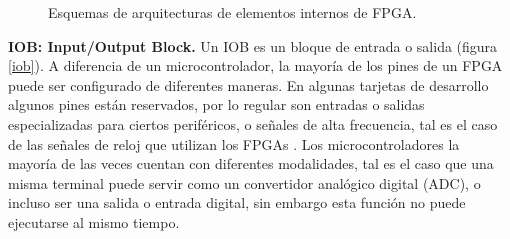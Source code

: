 \documentclass[twoside,spanish,ESP,MSc]{plantillaLabUPV}
\theoremstyle{definition}
\newcommand{\f}{FPGA }
\newcommand{\fs}{FPGAs }
\begin{document}
\begin{figure}
	 \hspace{5mm}
	\caption{Esquemas de arquitecturas de elementos internos de FPGA.}
	\label{efepe}
\end{figure}


\checkmark\textbf{IOB: Input/Output Block.} Un IOB es un bloque de entrada o salida (figura \ref{iob}). A diferencia de un microcontrolador, la mayoría de los pines de un \f puede ser configurado de diferentes maneras. En algunas tarjetas de desarrollo algunos pines están reservados, por lo regular son entradas o salidas especializadas para ciertos periféricos, o señales de alta frecuencia, tal es el caso de las señales de reloj que utilizan los \fs. Los microcontroladores la mayoría de las veces cuentan con diferentes modalidades, tal es el caso que una misma terminal puede servir como un convertidor analógico digital (ADC), o incluso ser una salida o entrada digital, sin embargo esta función no puede ejecutarse al mismo tiempo.\\
\end{document}
